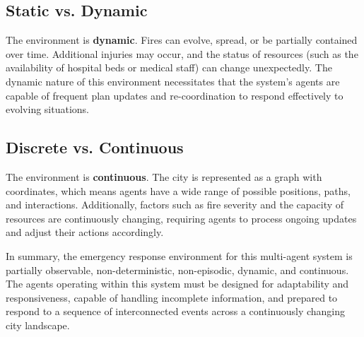 \subsection{Static vs. Dynamic}

The environment is \textbf{dynamic}. Fires can evolve, spread, or be partially contained over time. Additional injuries may occur, and the status of resources
(such as the availability of hospital beds or medical staff) can change unexpectedly. The dynamic nature of this environment necessitates that the system's
agents are capable of frequent plan updates and re-coordination to respond effectively to evolving situations.

\subsection{Discrete vs. Continuous}

The environment is \textbf{continuous}. The city is represented as a graph with coordinates, which means agents have a wide range of possible positions,
paths, and interactions. Additionally, factors such as fire severity and the capacity of resources are continuously changing, requiring agents to
process ongoing updates and adjust their actions accordingly.


In summary, the emergency response environment for this multi-agent system is partially observable, non-deterministic, non-episodic, dynamic, and
continuous. The agents operating within this system must be designed for adaptability and responsiveness, capable of handling incomplete information,
and prepared to respond to a sequence of interconnected events across a continuously changing city landscape.

